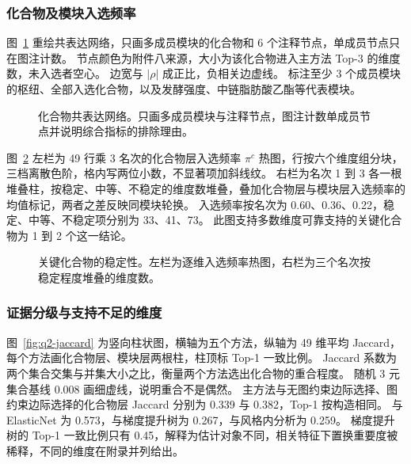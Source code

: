 \subsubsection{化合物及模块入选频率}

图~\ref{fig:q2-network} 重绘共表达网络，只画多成员模块的化合物和 6 个注释节点，单成员节点只在图注计数。
节点颜色为附件八来源，大小为该化合物进入主方法 Top-3 的维度数，未入选者空心。
边宽与 $\lvert\rho\rvert$ 成正比，负相关边虚线。
标注至少 3 个成员模块的枢纽、全部入选化合物，以及发酵强度、中链脂肪酸乙酯等代表模块。

\begin{figure}[htbp]\centering
{}
\caption{化合物共表达网络。只画多成员模块与注释节点，图注计数单成员节点并说明综合指标的排除理由。}
\label{fig:q2-network}
\end{figure}

图~\ref{fig:q2-stability} 左栏为 49 行乘 3 名次的化合物层入选频率 $\pi^c$ 热图，行按六个维度组分块，三档离散色阶，格内写两位小数，不显著项加斜线纹。
右栏为名次 1 到 3 各一根堆叠柱，按稳定、中等、不稳定的维度数堆叠，叠加化合物层与模块层入选频率的均值标记，两者之差反映同模块轮换。
入选频率按名次为 0.60、0.36、0.22，稳定、中等、不稳定项分别为 33、41、73。
此图支持多数维度可靠支持的关键化合物为 1 到 2 个这一结论。

\begin{figure}[htbp]\centering
{}
\caption{关键化合物的稳定性。左栏为逐维入选频率热图，右栏为三个名次按稳定程度堆叠的维度数。}
\label{fig:q2-stability}
\end{figure}

\subsubsection{证据分级与支持不足的维度}

图~\ref{fig:q2-jaccard} 为竖向柱状图，横轴为五个方法，纵轴为 49 维平均 Jaccard，每个方法画化合物层、模块层两根柱，柱顶标 Top-1 一致比例。
Jaccard 系数为两个集合交集与并集大小之比，衡量两个方法选出化合物的重合程度。
随机 3 元集合基线 0.008 画细虚线，说明重合不是偶然。
主方法与无图约束边际选择、图约束边际选择的化合物层 Jaccard 分别为 0.339 与 0.382，Top-1 按构造相同。
与 ElasticNet 为 0.573，与梯度提升树为 0.267，与风格内分析为 0.259。
梯度提升树的 Top-1 一致比例只有 0.45，解释为估计对象不同，相关特征下置换重要度被稀释，不同的维度在附录并列给出。

